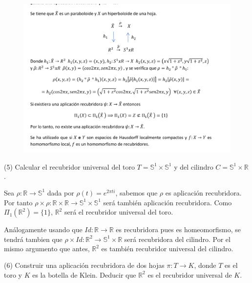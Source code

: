 \documentclass[
  a4paper,
  spanish,
  12pt,
]{scrartcl}
\begin{document}
\begin{figure}[h]
    \centering
    \includegraphics[width=\textwidth]{ej4.png}
    \label{fig:etiqueta}
\end{figure}


\begin{ejer}
(5) Calcular el recubridor universal del toro $T=\mathbb{S}^{1} \times \mathbb{S}^{1}$ y del cilindro $C=\mathbb{S}^{1} \times \mathbb{R}$.\\
\end{ejer}

\begin{sol}
Sea $\rho: \mathbb{R} \rightarrow \mathbb{S}^1$ dada por $\rho(t) = e^{2\pi t i}$, sabemos que 
$\rho$ es aplicación recubridora. Por tanto $\rho \times \rho: \mathbb{R} \times \mathbb{R} \rightarrow \mathbb{S}^1 \times \mathbb{S}^1$ será
también aplicación recubridora. Como $\Pi_1(\mathbb{R}^2) = \{1\}$, $\mathbb{R}^2$ será el recubridor universal del toro.

Análogamente usando que $Id: \mathbb{R} \rightarrow \mathbb{R}$ es recubridora pues es homeomorfismo, se tendrá tambien que
$\rho \times Id: \mathbb{R}^2 \rightarrow \mathbb{S}^1 \times \mathbb{R}$ será recubridora del cilindro.
Por el mismo argumento que antes, $\mathbb{R}^2$ es también recubridor universal del cilindro.
\end{sol}

\newpage

\begin{ejer}
(6) Construir una aplicación recubridora de dos hojas $\pi: T \rightarrow K$, donde $T$ es el toro y $K$ es la botella de Klein. Deducir que $\mathbb{R}^{2}$ es el recubridor universal de $K$.\\
\end{ejer}
\end{document}
